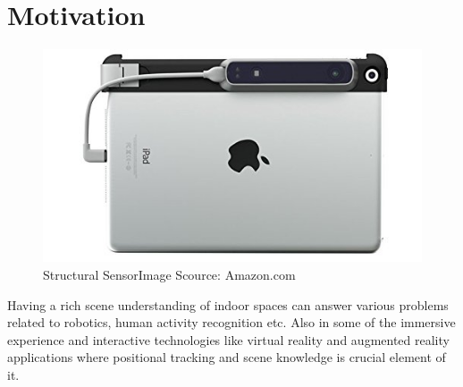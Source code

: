\section{Motivation}
\begin{figure}[!b]
    \centering
    \includegraphics[width = 12cm]{Figures/ipad.jpg}
    \caption{Structural SensorImage Scource: Amazon.com}
    \label{fig:Structural_Sensor}
\end{figure}{}

Having a rich scene understanding of indoor spaces can answer various problems related to robotics, human activity recognition etc. Also in some of the immersive experience and interactive technologies like  virtual reality and augmented reality applications where positional tracking and scene knowledge is crucial element of it.

